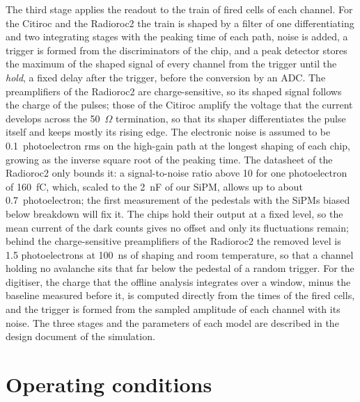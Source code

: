 \documentclass[11pt]{article}
\begin{document}
The third stage applies the readout to the train of fired cells of each
channel. For the Citiroc and the Radioroc2 the train is shaped by a filter
of one differentiating and two integrating stages with the peaking time of
each path, noise is added, a trigger is formed from the discriminators of
the chip, and a peak detector stores the maximum of the shaped signal of
every channel from the trigger until the \emph{hold}, a fixed delay after
the trigger, before the conversion by an ADC. The preamplifiers of the
Radioroc2 are charge-sensitive, so its shaped signal follows the charge of
the pulses; those of the Citiroc amplify the voltage that the current
develops across the 50~$\Omega$ termination, so that its shaper
differentiates the pulse itself and keeps mostly its rising edge. The
electronic noise is assumed to be 0.1~photoelectron rms on the high-gain
path at the longest shaping of each chip, growing as the inverse square
root of the peaking time. The datasheet of the Radioroc2 only bounds it: a
signal-to-noise ratio above 10 for one photoelectron of 160~fC, which,
scaled to the 2~nF of our SiPM, allows up to about 0.7~photoelectron; the
first measurement of the pedestals with the SiPMs biased below breakdown
will fix it. The chips hold their output at a fixed level, so
the mean current of the dark counts gives no offset and only its
fluctuations remain; behind the charge-sensitive preamplifiers of the
Radioroc2 the removed level is 1.5 photoelectrons at 100~ns of shaping
and room temperature, so that a channel holding no avalanche sits that far
below the pedestal of a random trigger. For the digitiser, the charge
that the offline analysis integrates over a window, minus the baseline
measured before it, is computed directly from the times of the fired
cells, and the trigger is formed from the sampled amplitude of each
channel with its noise. The three stages and the parameters of each model
are described in the design document of the simulation.

\section{Operating conditions}
\label{sec:conditions}
\end{document}
